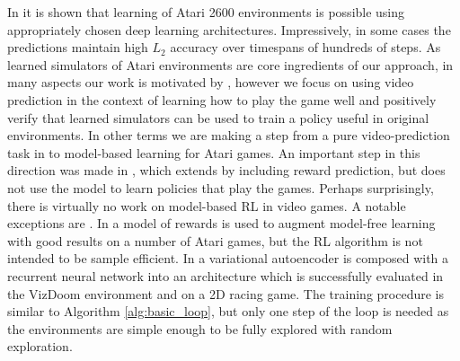 In \cite{video_prediction, recurrent} it is shown that learning of Atari 2600 environments is possible using appropriately chosen deep learning architectures. Impressively, in some cases the predictions maintain high $L_2$ accuracy over timespans of hundreds of steps. 
As learned simulators of Atari environments are core ingredients of our approach, in many aspects our work is motivated by \cite{video_prediction, recurrent}, however we focus on using video prediction in the context of learning how to play the game well and positively verify that learned simulators can be used to train a policy useful in original environments. In other terms we are making a step from a pure video-prediction task in \cite{video_prediction, recurrent} to model-based learning for Atari games.
An important step in this direction was made in \cite{video_reward_prediction}, which extends \cite{video_prediction} by including reward prediction, but does not use the model to learn policies that play the games.
Perhaps surprisingly, there is virtually no work on model-based RL in video games.
A notable exceptions are 
\cite{vpn,world_models}. In \cite{vpn} a model of rewards is used to augment model-free learning with good results on a number of Atari games, but the RL algorithm is not intended to be sample efficient.
In \cite{world_models} a variational autoencoder is composed with a recurrent neural network into an architecture  
which is successfully evaluated in the VizDoom environment and on a 2D racing game. 
The training procedure is similar to  Algorithm \ref{alg:basic_loop}, but only one step of the loop is needed as the environments are simple enough to be fully explored with random exploration.

